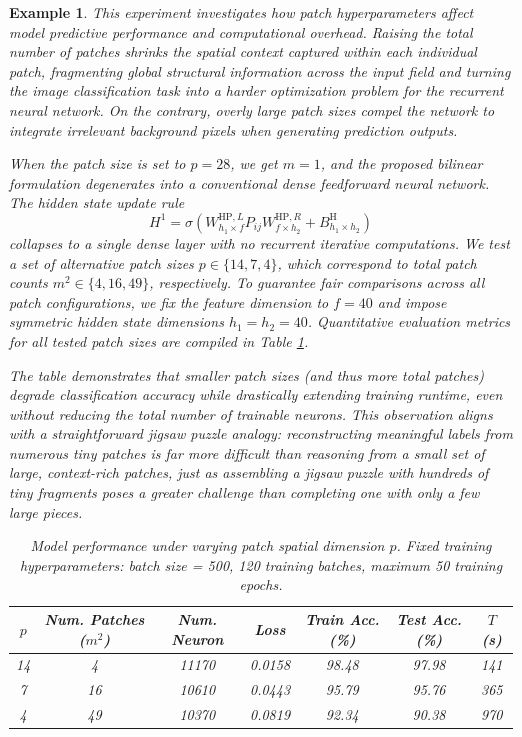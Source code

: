 \documentclass[pdflatex,sn-mathphys-num]{sn-jnl}%
\theoremstyle{thmstyleone}%
\theoremstyle{thmstyletwo}%
\newtheorem{example}{Example}%
\theoremstyle{thmstylethree}%
\begin{document}
\begin{example}
This experiment investigates how patch hyperparameters affect model predictive performance and computational overhead. Raising the total number of patches shrinks the spatial context captured within each individual patch, fragmenting global structural information across the input field and turning the image classification task into a harder optimization problem for the recurrent neural network. On the contrary, overly large patch sizes compel the network to integrate irrelevant background pixels when generating prediction outputs.

When the patch size is set to $p=28$, we get $m=1$, and the proposed bilinear formulation degenerates into a conventional dense feedforward neural network. The hidden state update rule
\begin{equation}
H^{1}=\sigma\left(W^{\text{HP},L}_{h_1\times f} P_{ij} W^{\text{HP},R}_{f\times h_2}
+ B^{\text{H}}_{h_1\times h_2}\right)
\end{equation}
collapses to a single dense layer with no recurrent iterative computations. We test a set of alternative patch sizes $p\in\{14,7,4\}$, which correspond to total patch counts $m^2 \in \{4,16,49\}$, respectively. To guarantee fair comparisons across all patch configurations, we fix the feature dimension to $f=40$ and impose symmetric hidden state dimensions $h_1=h_2=40$. Quantitative evaluation metrics for all tested patch sizes are compiled in Table \ref{Tab:7}.

The table demonstrates that smaller patch sizes (and thus more total patches) degrade classification accuracy while drastically extending training runtime, even without reducing the total number of trainable neurons. This observation aligns with a straightforward jigsaw puzzle analogy: reconstructing meaningful labels from numerous tiny patches is far more difficult than reasoning from a small set of large, context-rich patches, just as assembling a jigsaw puzzle with hundreds of tiny fragments poses a greater challenge than completing one with only a few large pieces.

\begin{table}[htbp]
\centering
\caption{Model performance under varying patch spatial dimension $p$. Fixed training hyperparameters: batch size = 500, 120 training batches, maximum 50 training epochs.}
\label{Tab:7}
\begin{tabular}{ccccccc}
\toprule
$p$ & Num. Patches ($m^2$) & Num. Neuron  & Loss & Train Acc. (\%) & Test Acc. (\%) & $T$ (s) \\
\midrule
14 & 4   & 11170  & 0.0158   & 98.48 & 97.98 & 141  \\
7  & 16  & 10610  & 0.0443   & 95.79 & 95.76 & 365 \\
4  & 49  & 10370  & 0.0819   & 92.34 & 90.38 & 970  \\
\bottomrule
\end{tabular}
\end{table}
\end{example}
\end{document}
